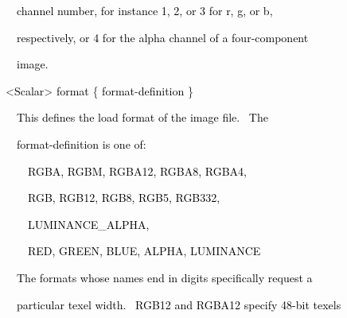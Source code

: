 \documentclass[a4paper]{article}
\newcommand\textstyleOOoComputerKeyWord[1]{\textrm{\textcolor[rgb]{0.0,0.0,0.5019608}{#1}}}
\newcommand\textstyleOOoAssemblerSpecialChar[1]{\textrm{\textcolor[rgb]{0.0,0.5019608,0.0}{#1}}}
\newcommand\textstyleOOoAssemblerIdent[1]{\textrm{\textcolor{black}{#1}}}
\begin{document}
{\color{black}
\textstyleOOoComputerKeyWord{\textcolor{black}{\ \ \ \ channel number, for instance 1, 2, or 3 for r, g, or b,}}}

{\color{black}
\textstyleOOoComputerKeyWord{\textcolor{black}{\ \ \ \ respectively, or 4 for the alpha channel of a four-component}}}

{\color{black}
\textstyleOOoComputerKeyWord{\textcolor{black}{\ \ \ \ image.}}}


\bigskip

{\color{black}
\textstyleOOoComputerKeyWord{\textcolor{black}{\ \ }}\textstyleOOoAssemblerSpecialChar{{\textless}}\textstyleOOoAssemblerIdent{Scalar}\textstyleOOoAssemblerSpecialChar{{\textgreater}}\textstyleOOoComputerKeyWord{\textcolor{black}{
}}\textstyleOOoAssemblerIdent{format}\textstyleOOoComputerKeyWord{\textcolor{black}{
}}\textstyleOOoAssemblerSpecialChar{\{}\textstyleOOoComputerKeyWord{\textcolor{black}{
}}\textstyleOOoAssemblerIdent{format}\textstyleOOoAssemblerSpecialChar{{}-}\textstyleOOoAssemblerIdent{definition}\textstyleOOoComputerKeyWord{\textcolor{black}{
}}\textstyleOOoAssemblerSpecialChar{\}}}


\bigskip

{\color{black}
\textstyleOOoComputerKeyWord{\textcolor{black}{\ \ \ \ This defines the load format of the image file. \ The}}}

{\color{black}
\textstyleOOoComputerKeyWord{\textcolor{black}{\ \ \ \ format-definition is one of:}}}

\clearpage
\bigskip


\bigskip

{\color{black}
\textstyleOOoComputerKeyWord{\textcolor{black}{\ \ \ \ \ \ RGBA, RGBM, RGBA12, RGBA8, RGBA4,}}}

{\color{black}
\textstyleOOoComputerKeyWord{\textcolor{black}{\ \ \ \ \ \ RGB, RGB12, RGB8, RGB5, RGB332,}}}

{\color{black}
\textstyleOOoComputerKeyWord{\textcolor{black}{\ \ \ \ \ \ LUMINANCE\_ALPHA,}}}

{\color{black}
\textstyleOOoComputerKeyWord{\textcolor{black}{\ \ \ \ \ \ RED, GREEN, BLUE, ALPHA, LUMINANCE}}}


\bigskip

{\color{black}
\textstyleOOoComputerKeyWord{\textcolor{black}{\ \ \ \ The formats whose names end in digits specifically request a}}}

{\color{black}
\textstyleOOoComputerKeyWord{\textcolor{black}{\ \ \ \ particular texel width. \ RGB12 and RGBA12 specify 48-bit
texels}}}
\end{document}
